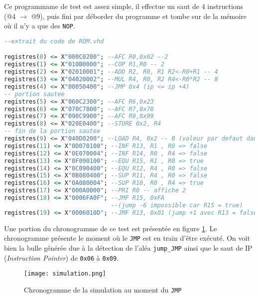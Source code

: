 Ce programmame de test est assez simple, il effectue un saut de 4 instructions (@4 $\rightarrow$ @9), puis fini par déborder du programme et tombe sur de la mémoire où il n'y a que des \texttt{NOP}.

\begin{lstlisting}[language=VHDL]
--extrait du code de ROM.vhd

registres(0) <= X"000C0200"; --AFC R0,0x02 --2
registres(1) <= X"010B0000"; --COP R1,R0 -- 2
registres(2) <= X"02010001"; --ADD R2, R0, R1 R2<-R0+R1 -- 4
registres(3) <= X"04020002"; --MUL R4, R0, R2 R4<-R0*R2 -- 8
registres(4) <= X"00050400"; --JMP 0x4 (ip <= ip +4)
-- portion sautee
registres(5) <= X"060C2300"; --AFC R6,0x23
registres(6) <= X"070C7800"; --AFC R7,0x78
registres(7) <= X"090C9900"; --AFC R9,0x99
registres(8) <= X"020E0400"; --STORE 0x2, R4
-- fin de la portion sautee
registres(9) <= X"040D0200"; --LOAD R4, 0x2 -- 0 (valeur par defaut dans la RAM)
registres(11) <= X"0D070100"; --INF R13, R1 , R0 => false
registres(12) <= X"0E070004"; --INF R14, R0 , R4 => false
registres(13) <= X"0F090100"; --EQU R15, R1 , R0 => true
registres(14) <= X"0C090400"; --EQU R12, R4 , R0 => false
registres(15) <= X"0B080400"; --SUP R11, R4 , R0 => false
registres(16) <= X"0A080004"; --SUP R10, R0 , R4 => true
registres(17) <= X"000A0000"; --PRI R0 -- affiche 2
registres(18) <= X"0006FA0F"; --JMF R15, 0xFA
                              --(jump -6 impossible car R15 = true)
registres(19) <= X"0006010D"; --JMF R13, 0x01 (jump +1 avec R13 = false)
\end{lstlisting}

Une portion du chronogramme de ce test est présentée en figure \ref{simulation}. Le chronogramme présente le moment où le \texttt{JMP} est en train d'être exécuté. On voit bien la bulle générée due à la détection de l'aléa \texttt{jump\_JMP} ainsi que le saut de IP (\textit{Instruction Pointer}) de \texttt{0x06} à \texttt{0x09}.

\newpage

\begin{figure}[!H]
    \centering
    \texttt{[image: simulation.png]}
    \caption{Chronogramme de la simulation au moment du \texttt{JMP}}
    \label{simulation}
\end{figure}